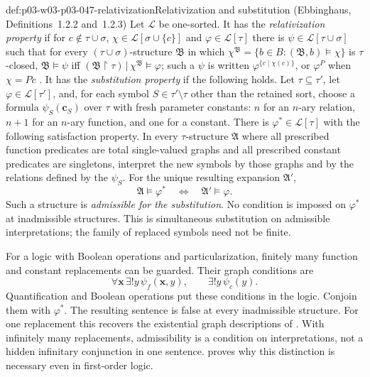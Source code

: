 \begin{hbdefinition}{def:p03-w03-p03-047-relativization}{Relativization and substitution (Ebbinghaus, Definitions~1.2.2 and~1.2.3)}
Let \(\mathscr L\) be one-sorted.  It has the \emph{relativization property}
if for \(c\notin\tau\cup\sigma\), \(\chi\in\mathscr L[\sigma\cup\{c\}]\) and
\(\varphi\in\mathscr L[\tau]\) there is \(\psi\in\mathscr L[\tau\cup\sigma]\)
such that for every \((\tau\cup\sigma)\)-structure \(\mathfrak B\) in which
\(\chi^{\mathfrak B}=\{b\in B:(\mathfrak B,b)\models\chi\}\) is
\(\tau\)-closed, \(\mathfrak B\models\psi\) iff
\((\mathfrak B\restriction\tau)\,|\,\chi^{\mathfrak B}\models\varphi\); such
a \(\psi\) is written \(\varphi^{\{c\mid\chi(c)\}}\), or \(\varphi^P\) when
\(\chi=Pc\) \cite[Ch.~II, Definition~1.2.2, p.~30]{Ebbinghaus1985ExtendedLogics}.
It has the \emph{substitution property} if the following holds.
Let \(\tau\subseteq\tau'\), let \(\varphi\in\mathscr L[\tau']\),
and, for each symbol \(S\in\tau'\setminus\tau\) other than the
retained sort, choose a formula \(\psi_S(\mathbf c_S)\) over \(\tau\)
with fresh parameter constants: \(n\) for an \(n\)-ary relation,
\(n+1\) for an \(n\)-ary function, and one for a constant.
There is \(\varphi^\ast\in\mathscr L[\tau]\) with the following
satisfaction property. In every \(\tau\)-structure \(\mathfrak A\)
where all prescribed function predicates are total single-valued graphs
and all prescribed constant predicates are singletons, interpret the
new symbols by those graphs and by the relations defined by the
\(\psi_S\). For the unique resulting expansion \(\mathfrak A'\),
\[
 \mathfrak A\models\varphi^\ast
 \quad\Longleftrightarrow\quad
 \mathfrak A'\models\varphi.
\]
Such a structure is \emph{admissible for the substitution}. No condition
is imposed on \(\varphi^\ast\) at inadmissible structures. This is
simultaneous substitution on admissible interpretations; the family
of replaced symbols need not be finite.

For a logic with Boolean operations and particularization, finitely
many function and constant replacements can be guarded. Their graph
conditions are
\[
 \forall\mathbf x\,\exists!y\,\psi_f(\mathbf x,y),
 \qquad \exists!y\,\psi_c(y).
\]
Quantification and Boolean operations put these conditions in the logic.
Conjoin them with \(\varphi^\ast\). The resulting sentence is false
at every inadmissible structure. For one replacement this recovers
the existential graph descriptions of
\cite[Ch.~II, Definitions~1.2.2--1.2.3, pp.~30--31]{Ebbinghaus1985ExtendedLogics}.
With infinitely many replacements, admissibility is a condition on
interpretations, not a hidden infinitary conjunction in one sentence.
 proves why this
distinction is necessary even in first-order logic.
\end{hbdefinition}

